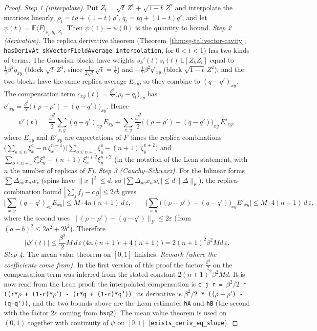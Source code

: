 \begin{proof}
\leanok
\emph{Step 1 (interpolate).} Put $Z_t=\sqrt t\,Z^1+\sqrt{1-t}\,Z^2$ and interpolate the matrices linearly, $\rho_t=t\rho+(1-t)\rho'$, $q_t=tq+(1-t)q'$, and let $\psi(t)=\mathbb E\langle F\rangle_{\rho_t,q_t,Z_t}$. Then $\psi(1)-\psi(0)$ is the quantity to bound.
\emph{Step 2 (derivative).} The replica derivative theorem (Theorem~\ref{thm:sg-tal:vector-cavity}; \texttt{hasDerivAt\_skVectorFieldAverage\_interpolation}, for $0<t<1$) has two kinds of terms. The Gaussian blocks have weights $s_k'(t)s_l(t)\,\mathbb E[Z_kZ_l]$ equal to $\frac12\beta^2q_{xy}$ (block $\sqrt t\,Z^1$, since $\frac1{2\sqrt t}\sqrt t=\frac12$) and $-\frac12\beta^2q'_{xy}$ (block $\sqrt{1-t}\,Z^2$), and the two blocks have the same replica average $E_{xy}$, so they combine to $(q-q')_{xy}$. The compensation term $c_{xy}(t)=\frac{\beta^2}2\big(\rho_t-q_t\big)_{xy}$ has $c'_{xy}=\frac{\beta^2}2\big((\rho-\rho')-(q-q')\big)_{xy}$. Hence
\[
\psi'(t)=\frac{\beta^2}2\sum_{x,y}(q-q')_{xy}\,E_{xy}+\sum_{x,y}\frac{\beta^2}2\Big((\rho-\rho')-(q-q')\Big)_{xy}\,E'_{xy},
\]
where $E_{xy}$ and $E'_{xy}$ are expectations of $F$ times the replica combinations $\big(\sum_{a\le n}\xi^a_x-n\,\xi^{n+1}_x\big)\big(\sum_{o\le n+1}\xi^o_y-(n+1)\,\xi^{n+2}_y\big)$ and $\sum_{o\le n+1}\xi^o_x\xi^o_y-(n+1)\,\xi^{n+2}_x\xi^{n+2}_y$ (in the notation of the Lean statement, with $n$ the number of replicas of $F$).
\emph{Step 3 (Cauchy--Schwarz).} For the bilinear forms $\sum\Delta_{uv}x_uw_v$ (spins have $\|x\|^2\le d$, so $|\sum\Delta_{uv}x_uw_v|\le d\|\Delta\|_F$), the replica-combination bound $|\sum_jf_j-c\,g|\le2cb$ gives
\[
\Big|\sum_{x,y}(q-q')_{xy}E_{xy}\Big|\le M\cdot4n(n+1)\,d\,\varepsilon,\qquad
\Big|\sum_{x,y}\Big((\rho-\rho')-(q-q')\Big)_{xy}E'_{xy}\Big|\le M\cdot4(n+1)\,d\,\varepsilon,
\]
where the second uses $\|(\rho-\rho')-(q-q')\|_F\le2\varepsilon$ (from $(a-b)^2\le2a^2+2b^2$). Therefore
\[
|\psi'(t)|\le\frac{\beta^2}2M\,d\,\varepsilon\,\big(4n(n+1)+4(n+1)\big)=2(n+1)^2\beta^2Md\,\varepsilon .
\]
\emph{Step 4.} The mean value theorem on $[0,1]$ finishes.
\emph{Remark (where the coefficients come from).} In the first version of this proof the factor $\frac{\beta^2}2$ on the compensation term was inferred from the stated constant $2(n+1)^2\beta^2Md$. It is now read from the Lean proof: the interpolated compensation is \texttt{c j r = $\beta^2/2$ * ((r*$\rho$ + (1-r)*$\rho'$) - (r*q + (1-r)*q'))}, its derivative is \texttt{$\beta^2/2$ * (($\rho-\rho'$) - (q-q'))}, and the two bounds above are the Lean estimates \texttt{hA} and \texttt{hB} (the second with the factor $2\varepsilon$ coming from \texttt{hsq2}). The mean value theorem is used on $(0,1)$ together with continuity of $\psi$ on $[0,1]$ (\texttt{exists\_deriv\_eq\_slope}).
\end{proof}

